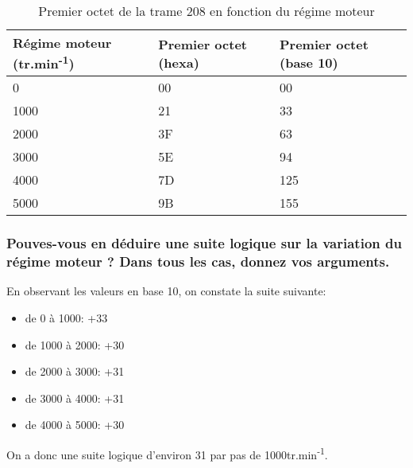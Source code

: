 \documentclass{rapportECC}
\begin{document}
\begin{table}[H]
    \begin{tabular}{|l|l|l|}
    \hline
    \textbf{Régime moteur (tr.min\textsuperscript{-1})} & \textbf{Premier octet (hexa)} & \textbf{Premier octet (base 10)} \\ \hline
    0                                  & 00                                       & 00                                          \\ \hline
    1000                               & 21                                       & 33                                          \\ \hline
    2000                               & 3F                                       & 63                                          \\ \hline
    3000                               & 5E                                       & 94                                          \\ \hline
    4000                               & 7D                                       & 125                                         \\ \hline   
    5000                               & 9B                                       & 155                                         \\ \hline  
    \end{tabular}
    \caption{Premier octet de la trame 208 en fonction du régime moteur}
    \label{tab:regime moteur trame 208}
\end{table}

\subsubsection*{Pouves-vous en déduire une suite logique sur la variation du régime moteur ? Dans tous les cas, donnez vos arguments.}

En observant les valeurs en base 10, on constate la suite suivante:

\begin{itemize}
    \item de 0 à 1000: +33
    \item de 1000 à 2000: +30
    \item de 2000 à 3000: +31
    \item de 3000 à 4000: +31
    \item de 4000 à 5000: +30
\end{itemize}

On a donc une suite logique d'environ 31 par pas de 1000tr.min\textsuperscript{-1}.
\end{document}
